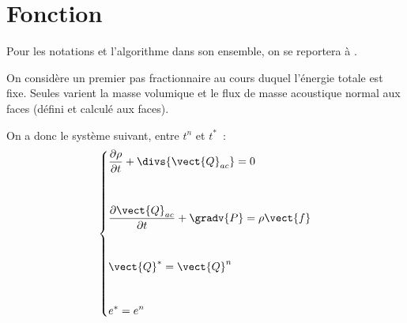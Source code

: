 
%
%
%
%


%
\vspace{1cm}
\section*{Fonction}

Pour les notations et l'algorithme dans son ensemble,
on se reportera à .

On considère un premier pas fractionnaire au cours duquel l'énergie totale
est fixe. Seules varient la masse volumique et le flux de masse acoustique
normal aux faces (défini et calculé aux faces).

On a donc le système suivant, entre $t^n$ et $t^*$~:
\begin{equation}\label{Cfbl_Cfmsvl_eq_acoustique_cfmsvl}
\left\{
\begin{aligned}
&\displaystyle\frac{\partial\rho}{\partial t}+\divs{\vect{Q}_{ac}} = 0 \\[1em]
&\\
&\displaystyle\frac{\partial\vect{Q}_{ac}}{\partial t}+\gradv{P} =
\rho \vect{f} \\[1em]
&\\
&\vect{Q}^*=\vect{Q}^n \\[1em]
&\\
&e^*=e^n
\end{aligned}
\right.
\end{equation}

